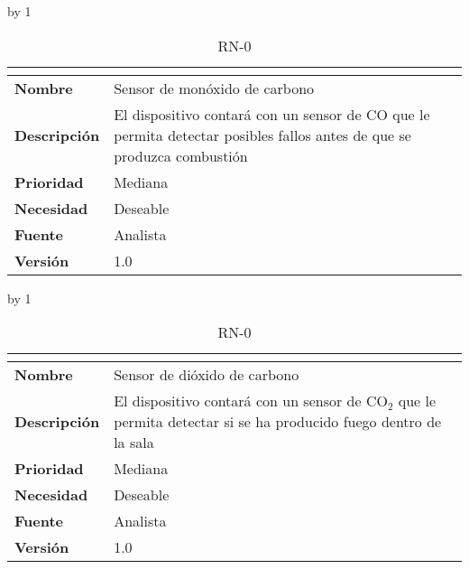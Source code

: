 \advance\rn by 1
\begin{table}[H]
	\caption{RN-0\number\rn}
	\begin{tabular}{|l|p{}|}
		\hline
		\multicolumn{2}{|c|}{\cellcolor[HTML]{BFBFBF}{\color[HTML]{000000} \textbf{RN-0\number\rn}}} \\ \hline
		\textbf{Nombre}      & Sensor de monóxido de carbono                                                                                          \\ \hline
		\textbf{Descripción} & El dispositivo contará con un sensor de CO que le permita detectar posibles fallos antes de que se produzca combustión \\ \hline
		\textbf{Prioridad}   & Mediana                                                                                                                \\ \hline
		\textbf{Necesidad}   & Deseable                                                                                                               \\ \hline
		\textbf{Fuente}      & Analista                                                                                                               \\ \hline
		\textbf{Versión}     & 1.0                                                                                                                    \\ \hline
	\end{tabular}
\end{table}
\advance\rn by 1
\begin{table}[H]
	\caption{RN-0\number\rn}
	\begin{tabular}{|l|p{}|}
		\hline
		\multicolumn{2}{|c|}{\cellcolor[HTML]{BFBFBF}{\color[HTML]{000000} \textbf{RN-0\number\rn}}} \\ \hline
		\textbf{Nombre}      & Sensor de dióxido de carbono                                                                                      \\ \hline
		\textbf{Descripción} & El dispositivo contará con un sensor de CO$_2$ que le permita detectar si se ha producido fuego dentro de la sala \\ \hline
		\textbf{Prioridad}   & Mediana                                                                                                           \\ \hline
		\textbf{Necesidad}   & Deseable                                                                                                          \\ \hline
		\textbf{Fuente}      & Analista                                                                                                          \\ \hline
		\textbf{Versión}     & 1.0                                                                                                               \\ \hline
	\end{tabular}
\end{table}
